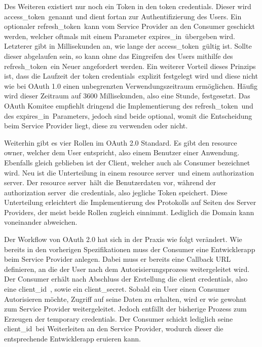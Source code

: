 Des Weiteren existiert nur noch ein Token in den \frqq token credentials\flqq .
Dieser wird \frqq access\_token\flqq\ genannt und dient fortan zur Authentifizierung des Users\cite[vgl.][]{oauth12}.
Ein optionaler \frqq refresh\_token\flqq\ kann vom Service Provider an den Consumer geschickt werden, welcher oftmals mit einem Parameter \frqq expires\_in\flqq\ übergeben wird\cite[vgl.][]{oauth12}.
Letzterer gibt in Millisekunden an, wie lange der \frqq access\_token\flqq\ gültig ist\cite[vgl.][]{oauth12}.
Sollte dieser abgelaufen sein, so kann ohne das Eingreifen des Users mithilfe des \frqq refresh\_token\flqq\ ein Neuer angefordert werden.
Ein weiterer Vorteil dieses Prinzips ist, dass die Laufzeit der \frqq token credentials\flqq\ explizit festgelegt wird und diese nicht wie bei OAuth 1.0 einen unbegrenzten Verwendungszeitraum ermöglichen.
Häufig wird dieser Zeitraum auf 3600 Millisekunden, also eine Stunde, festgesetzt.
Das OAuth Komitee empfiehlt dringend die Implementierung des \frqq refresh\_token\flqq\ und des \frqq expires\_in\flqq\ Parameters, jedoch sind beide optional, womit die Entscheidung beim Service Provider liegt, diese zu verwenden oder nicht\cite[vgl.][]{oauth12}.

Weiterhin gibt es vier Rollen im OAuth 2.0 Standard.
Es gibt den \frqq resource owner\flqq , welcher dem User entspricht, also einem Benutzer einer Anwendung\cite[vgl.][]{oauth12}.
Ebenfalls gleich geblieben ist der Client, welcher auch als Consumer bezeichnet wird\cite[vgl.][]{oauth12}.
Neu ist die Unterteilung in einem \frqq resource server\flqq\ und einem \frqq authorization server\flqq\cite[vgl.][]{oauth12}.
Der \frqq resource server\flqq\ hält die Benutzerdaten vor, während der \frqq authorization server\flqq\ die \frqq credentials\flqq , also jegliche Token speichert\cite[vgl.][]{oauth12}.
Diese Unterteilung erleichtert die Implementierung des Protokolls auf Seiten des Server Providers, der meist beide Rollen zugleich einnimmt.
Lediglich die Domain kann voneinander abweichen.

Der Workflow von OAuth 2.0 hat sich in der Praxis wie folgt verändert.
Wie bereits in den vorherigen Spezifikationen muss der Consumer eine Entwicklerapp beim Service Provider anlegen.
Dabei muss er bereits eine Callback \ac{URL} definieren, an die der User nach dem Autorisierungsprozess weitergeleitet wird.
Der Consumer erhält nach Abschluss der Erstellung die \frqq client credentials\flqq , also eine \frqq client\_id\flqq\ , sowie ein \frqq client\_secret\flqq .
Sobald ein User einen Consumer Autorisieren möchte, Zugriff auf seine Daten zu erhalten, wird er wie gewohnt zum Service Provider weitergeleitet.
Jedoch entfällt der bisherige Prozess zum Erzeugen der \frqq temporary credentials\flqq .
Der Consumer schickt lediglich seine \frqq client\_id\flqq\ bei Weiterleiten an den Service Provider, wodurch dieser die entsprechende Entwicklerapp eruieren kann.

